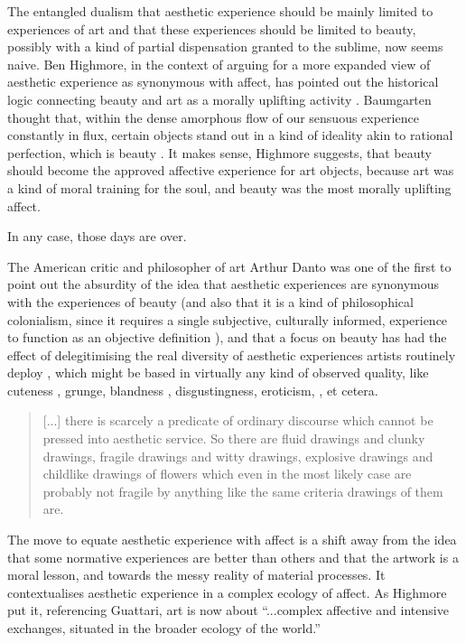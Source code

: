 \documentclass[letterpaper]{article}
\begin{document}
        The entangled dualism that aesthetic experience should be mainly limited to experiences of art and that these experiences should be limited to beauty, possibly with a kind of partial dispensation granted to the sublime, now seems naive. Ben Highmore, in the context of arguing for a more expanded view of aesthetic experience as synonymous with affect, has pointed out the historical logic connecting beauty and art as a morally uplifting activity \citep[p.121-122]{HighmoreBttrAftrTst2010}. Baumgarten thought that, within the dense amorphous flow of our sensuous experience constantly in flux, certain objects stand out in a kind of ideality akin to rational perfection, which is beauty \citep[p.328]{EagletonFrPrtclrs1990}. It makes sense, Highmore suggests, that beauty should become the approved affective experience for art objects, because art was a kind of moral training for the soul, and beauty was the most morally uplifting affect.
        
        In any case, those days are over.

        The American critic and philosopher of art Arthur Danto was one of the first to point out the absurdity of the idea that aesthetic experiences are synonymous with the experiences of beauty (and also that it is a kind of philosophical colonialism, since it requires a single subjective, culturally informed, experience to function as an objective definition \citep[p.124]{DantoEmbdMnngs2007}), and that a focus on beauty has had the effect of delegitimising the real diversity of aesthetic experiences artists routinely deploy \citep[p.59]{DantoThAbsOfBty2003}, which might be based in virtually any kind of observed quality, like cuteness \citep[p.28]{DantoThPhlsphclArt2005}, grunge, blandness \citep[p.126]{DantoEmbdMnngs2007}, disgustingness, eroticism, \citep[p.59]{DantoThAbsOfBty2003}, et cetera.

        \begin{quote}
            [...] there is scarcely a predicate of ordinary discourse which cannot be pressed into aesthetic service. So there are fluid drawings and clunky drawings, fragile drawings and witty drawings, explosive drawings and childlike drawings of flowers which even in the most likely case are probably not fragile by anything like the same criteria drawings of them are. \citep[pp. 28-29]{DantoThPhlsphclArt2005}
        \end{quote}

        The move to equate aesthetic experience with affect is a shift away from the idea that some normative experiences are better than others and that the artwork is a moral lesson, and towards the messy reality of material processes. It contextualises aesthetic experience in a complex ecology of affect. As Highmore put it, referencing Guattari, art is now about “...complex affective and intensive exchanges, situated in the broader ecology of the world.” \citep[p.155]{HighmoreBttrAftrTst2010}
\end{document}
